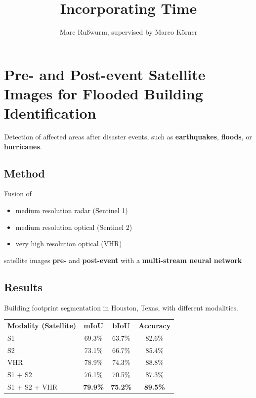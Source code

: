 \documentclass[a0]{tumposter}
\title{
	Incorporating Time%
	}
\author{
	Marc Rußwurm, supervised by Marco Körner
	}
\newcommand{\pre}[1]{
	{\color{focusone}\textbf{#1}}
}
\newcommand{\post}[1]{
	{\color{focustwo}\textbf{#1}}
}
\begin{document}
\maketitle

\vspace{-1.2em}
\section{Pre- and Post-event Satellite Images for Flooded Building Identification}
\begin{minipage}{0.35\linewidth} 
Detection of affected areas after disaster events, such as \textbf{earthquakes}, \textbf{floods}, or \textbf{hurricanes}.
\subsection{Method}
Fusion of
\begin{itemize}%
\item medium resolution radar (Sentinel 1)
\item medium resolution optical (Sentinel 2)
\item very high resolution optical (VHR)
\end{itemize}
satellite images \pre{pre-} and \post{post-event} with a \textbf{multi-stream neural network}

\subsection{Results}

Building footprint segmentation in Houston, Texas, with different modalities.

\vspace{.5em}
\small
\begin{tabularx}{\linewidth}{X c c c} 
	\toprule
	\textbf{Modality (Satellite)} & \textbf{mIoU} & \textbf{bIoU} & \textbf{Accuracy} \\
	\cmidrule(lr){1-1}
	\cmidrule(lr){2-2}
	\cmidrule(lr){3-3}
	\cmidrule(lr){4-4}
	S1 & 69.3\% & 63.7\% & 82.6\% \\
	S2 & 73.1\% & 66.7\% & 85.4\% \\
	VHR & 78.9\% & 74.3\% & 88.8\% \\
	S1 + S2 & 76.1\% &  70.5\% & 87.3\% \\
	S1 + S2 + VHR & \bfseries 79.9\% & \bfseries 75.2\% & \bfseries89.5\% \\
	\bottomrule
\end{tabularx}


\end{minipage}
\end{document}
